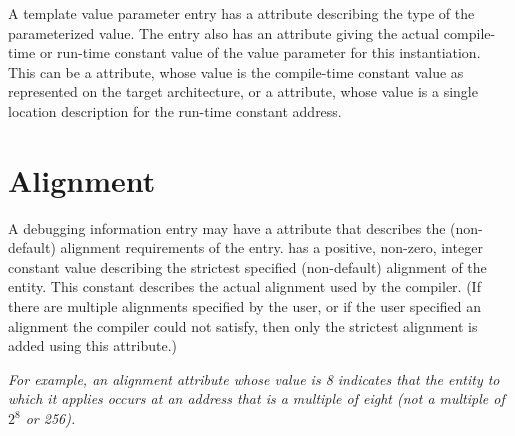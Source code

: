 A template value parameter entry has a \DWATtype{} attribute 
describing the type of the parameterized value.
The entry also has an attribute giving the 
actual compile-time or run-time constant value 
of the value parameter for this instantiation.
This can be a 
\DWATconstvalue{} 
attribute, whose value is the compile-time constant value 
as represented on the target architecture, or a 
\DWATlocation{} attribute, whose value is a 
single location description for the run-time constant address.

\section{Alignment}
\label{chap:alignment}
A debugging information entry may have a 
\DWATalignment{} attribute
that describes the (non-default) alignment requirements of the entry.
\DWATalignment{} has a positive, non-zero, integer constant value
describing the strictest specified (non-default) alignment of the entity. 
This constant describes the actual alignment used by the compiler.
(If there are multiple alignments specified by the user, or if the 
user specified an alignment the compiler could not satisfy, then 
only the strictest alignment is added using this attribute.)

\textit{For example, an alignment attribute whose value is 8 indicates
that the entity to which it applies occurs at an address that is a
multiple of eight (not a multiple of $2^8$ or 256).}